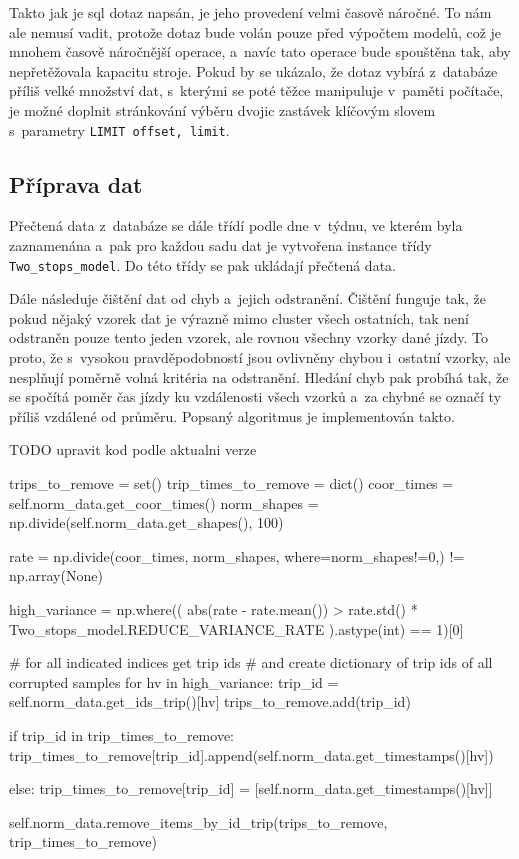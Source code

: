 \bigbreak


Takto jak je \gls{sql} dotaz napsán, je jeho provedení velmi časově náročné. To nám ale nemusí vadit, protože dotaz bude volán pouze před výpočtem modelů, což je mnohem časově náročnější operace, a~navíc tato operace bude spouštěna tak, aby nepřetěžovala kapacitu stroje. Pokud by se ukázalo, že dotaz vybírá z~databáze příliš velké množství dat, s~kterými se poté těžce manipuluje v~paměti počítače, je možné doplnit stránkování výběru dvojic zastávek klíčovým slovem s~parametry \texttt{LIMIT offset, limit}.


\subsection{Příprava dat}

Přečtená data z~databáze se dále třídí podle dne v~týdnu, ve kterém byla zaznamenána a~pak pro každou sadu dat je vytvořena instance třídy \texttt{Two\_stops\allowbreak\_model}. Do této třídy se pak ukládají přečtená data.


\bigbreak

Dále následuje čištění dat od chyb a~jejich odstranění. Čištění funguje tak, že pokud nějaký vzorek dat je výrazně mimo cluster všech ostatních, tak není odstraněn pouze tento jeden vzorek, ale rovnou všechny vzorky dané jízdy. To proto, že s~vysokou pravděpodobností jsou ovlivněny chybou i~ostatní vzorky, ale nesplňují poměrně volná kritéria na odstranění. Hledání chyb pak probíhá tak, že se spočítá poměr čas jízdy ku vzdálenosti všech vzorků a~za chybné se označí ty příliš vzdálené od průměru. Popsaný algoritmus je implementován takto.


TODO upravit kod podle aktualni verze
\begin{code}[frame=none]
trips_to_remove = set()
trip_times_to_remove = dict()
coor_times = self.norm_data.get_coor_times()
norm_shapes = np.divide(self.norm_data.get_shapes(), 100)


rate = np.divide(coor_times, norm_shapes, where=norm_shapes!=0,) != np.array(None)


high_variance = np.where((
    abs(rate - rate.mean()) > rate.std() * Two_stops_model.REDUCE_VARIANCE_RATE
  ).astype(int) == 1)[0]


# for all indicated indices get trip ids
# and create dictionary of trip ids of all corrupted samples
for hv in high_variance:
  trip_id = self.norm_data.get_ids_trip()[hv]
  trips_to_remove.add(trip_id)


  if trip_id in trip_times_to_remove:
    trip_times_to_remove[trip_id].append(self.norm_data.get_timestamps()[hv])


  else:
    trip_times_to_remove[trip_id] = [self.norm_data.get_timestamps()[hv]]


self.norm_data.remove_items_by_id_trip(trips_to_remove, trip_times_to_remove)
\end{code}


